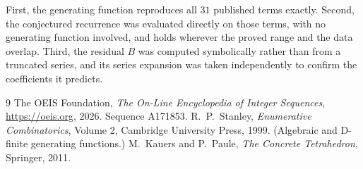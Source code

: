 \documentclass[11pt,a4paper]{article}
\theoremstyle{plain}
\theoremstyle{definition}
\begin{document}
First, the generating function reproduces all $31$ published terms exactly. Second,
the conjectured recurrence was evaluated directly on those terms, with no generating function
involved, and holds wherever the proved range and the data overlap. Third, the residual $B$ was
computed symbolically rather than from a truncated series, and its series expansion was taken
independently to confirm the coefficients it predicts.

\begin{thebibliography}{9}
 The OEIS Foundation, \emph{The On-Line Encyclopedia of Integer Sequences},
\url{https://oeis.org}, 2026. Sequence A171853.
 R.~P.~Stanley, \emph{Enumerative Combinatorics}, Volume 2, Cambridge
University Press, 1999. (Algebraic and D-finite generating functions.)
 M.~Kauers and P.~Paule, \emph{The Concrete Tetrahedron}, Springer, 2011.
\end{thebibliography}
\end{document}

